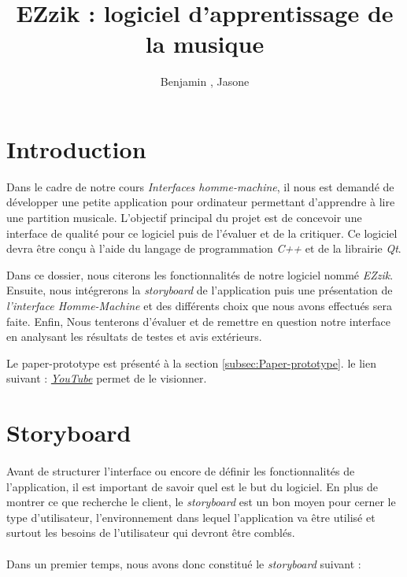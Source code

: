 \documentclass[a4paper, 12pt]{article}
\author{Benjamin \bsc{Moreau}, Jasone \bsc{Lenormand}}
\title{EZzik : logiciel d'apprentissage de la musique}
\begin{document}
\maketitle
\clearpage
\tableofcontents
\clearpage

\section{Introduction} 
    Dans le cadre de notre cours  \emph{Interfaces homme-machine}, il nous est demandé de développer une petite application pour ordinateur permettant d'apprendre à lire une partition musicale. L'objectif principal du projet est de concevoir une interface de qualité pour ce logiciel puis de l'évaluer et de la critiquer. Ce logiciel devra être conçu à l'aide du langage de programmation \emph{C++} et de la librairie \emph{Qt}.
    
    Dans ce dossier, nous citerons les fonctionnalités de notre logiciel nommé \emph{EZzik}. Ensuite, nous intégrerons la \emph{storyboard} de l'application puis une présentation de \emph{l'interface Homme-Machine} et des différents choix que nous avons effectués sera faite. Enfin, Nous tenterons d'évaluer et de remettre en question notre interface en analysant les résultats de testes et avis extérieurs.

    Le paper-prototype est présenté à la section \ref{subsec:Paper-prototype}. le lien suivant : \href{https://youtu.be/iWcTD7AGAPs}{\emph{YouTube}} permet de le visionner.

\section{Storyboard}
    \paragraph{}
    Avant de structurer l'interface ou encore de définir les fonctionnalités de l'application, il est important de savoir quel est le but du logiciel. En plus de montrer ce que recherche le client, le \emph{storyboard} est un bon moyen pour cerner le type d'utilisateur, l'environnement dans lequel l'application va être utilisé et surtout les besoins de l'utilisateur qui devront être comblés.
    \paragraph{}
    Dans un premier temps, nous avons donc constitué le \emph{storyboard} suivant :
     
\end{document}
